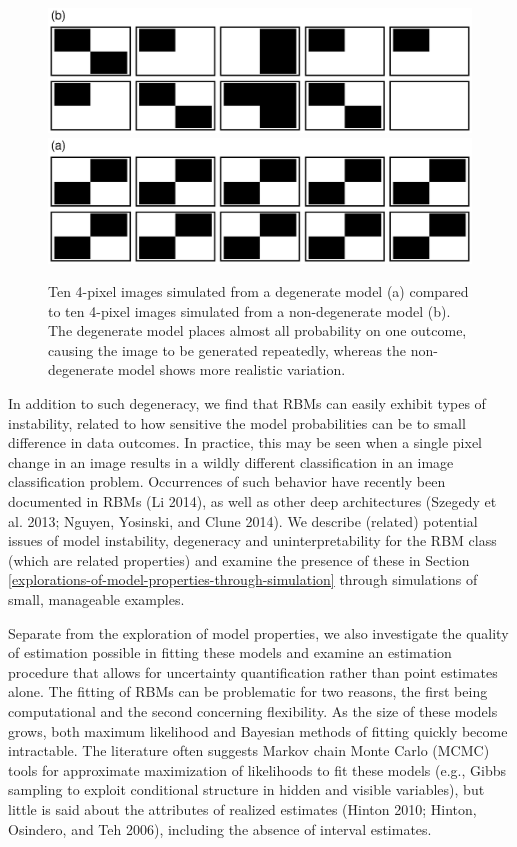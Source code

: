\documentclass[AMS,STIX1COL]{WileyNJD-v2}
\begin{document}
\par

\begin{figure}
\includegraphics[width=1\linewidth]{paper_files/figure-latex/sample-models-1} \includegraphics[width=1\linewidth]{paper_files/figure-latex/sample-models-2} \caption{\label{fig:sample-models}Ten 4-pixel images simulated from a degenerate model (a) compared to ten 4-pixel images simulated from a non-degenerate model (b). The degenerate model places almost all probability on one outcome, causing the image to be generated repeatedly, whereas the non-degenerate model shows more realistic variation.}\label{fig:sample-models}
\end{figure}

In addition to such degeneracy, we find that RBMs can easily exhibit
types of instability, related to how sensitive the model probabilities
can be to small difference in data outcomes. In practice, this may be
seen when a single pixel change in an image results in a wildly
different classification in an image classification problem. Occurrences
of such behavior have recently been documented in RBMs (Li 2014), as
well as other deep architectures (Szegedy et al. 2013; Nguyen, Yosinski,
and Clune 2014). We describe (related) potential issues of model
instability, degeneracy and uninterpretability for the RBM class (which
are related properties) and examine the presence of these in Section
\ref{explorations-of-model-properties-through-simulation} through
simulations of small, manageable examples.

Separate from the exploration of model properties, we also investigate
the quality of estimation possible in fitting these models and examine
an estimation procedure that allows for uncertainty quantification
rather than point estimates alone. The fitting of RBMs can be
problematic for two reasons, the first being computational and the
second concerning flexibility. As the size of these models grows, both
maximum likelihood and Bayesian methods of fitting quickly become
intractable. The literature often suggests Markov chain Monte Carlo
(MCMC) tools for approximate maximization of likelihoods to fit these
models (e.g., Gibbs sampling to exploit conditional structure in hidden
and visible variables), but little is said about the attributes of
realized estimates (Hinton 2010; Hinton, Osindero, and Teh 2006),
including the absence of interval estimates.
\end{document}
